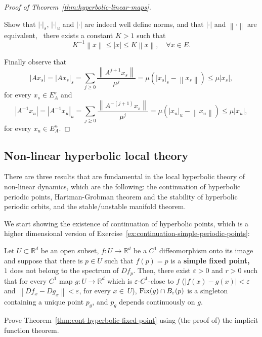 \documentclass{article}
\newcommand{\abs}[1]{\left\lvert{#1}\right\rvert}
\newcommand{\norm}[1]{\left\|{#1}\right\|}
\newcommand{\R}{\mathbb{R}}\newcommand{\N}{\mathbb{N}}
\newcommand{\eps}{\varepsilon}
\begin{document}
\begin{proof}[Proof of Theorem~\ref{thm:hyperbolic-linear-maps}]
 \begin{exercise}
   Show that $\abs{\cdot}_{s}$, $\abs{\cdot}_{u}$ and $\abs{\cdot}$ are indeed well define norms, and that $\abs{\cdot}$ and $\norm{\cdot}$ are equivalent, \ie~there exists a constant $K>1$ such that
   \begin{displaymath}
     K^{-1}\norm{x}\leq \abs{x}\leq K\norm{x}, \quad\forall x\in E.
   \end{displaymath}
 \end{exercise}

 Finally observe that
 \begin{displaymath}
   \abs{Ax_{s}} =\abs{Ax_{s}}_{s}=\sum_{j\geq 0} \frac{\norm{A^{j+1}x_{s}}}{\mu^{j}} = \mu (\abs{x_{s}}_{s}-\norm{x_{s}})\leq \mu\abs{x_{s}},
 \end{displaymath}
 for every $x_{s}\in E_{A}^{s}$ and
  \begin{displaymath}
   \abs{A^{-1}x_{u}} =\abs{A^{-1}x_{u}}_{u}=\sum_{j\geq 0} \frac{\norm{A^{-(j+1)}x_{s}}}{\mu^{j}} = \mu (\abs{x_{u}}_{u}-\norm{x_{u}})\leq \mu\abs{x_{u}},
 \end{displaymath}
 for every $x_{u}\in E^{u}_{A}$.
\end{proof}

\subsection{Non-linear hyperbolic local theory}
\label{sec:non-linear-local-theory}

There are three results that are fundamental in the local hyperbolic theory of non-linear dynamics, which are the following: the continuation of hyperbolic periodic points, Hartman-Grobman theorem and the stability of hyperbolic periodic orbits, and the stable/unstable manifold theorem.

We start showing the existence of continuation of hyperbolic points, which is a higher dimensional version of Exercise~\ref{ex:continuation-simple-periodic-points}:

\begin{theorem}
  \label{thm:cont-hyperbolic-fixed-point}
  Let $U\subset\R^d$ be an open subset, $f\colon U\to\R^d$ be a $C^1$ diffeomorphism onto its image and suppose that there is $p\in U$ such that $f(p)=p$ is a \textbf{simple fixed point,} \ie~$1$ does not belong to the spectrum of $Df_p$. Then, there exist $\eps>0$ and $r>0$ such that for every $C^1$ map $g\colon U\to\R^d$ which is $\eps$-$C^1$-close to $f$ (\ie $\abs{f(x)-g(x)}<\eps$ and $\norm{Df_x-Dg_x}<\eps$, for every $x\in\ U$), $\Fix(g)\cap B_\eps(p)$ is a singleton containing a unique point $p_g$, and $p_g$ depends continuously on $g$.
\end{theorem}

\begin{exercise}
  Prove Theorem~\ref{thm:cont-hyperbolic-fixed-point} using (the proof of) the implicit function theorem.
\end{exercise}



\end{document}
